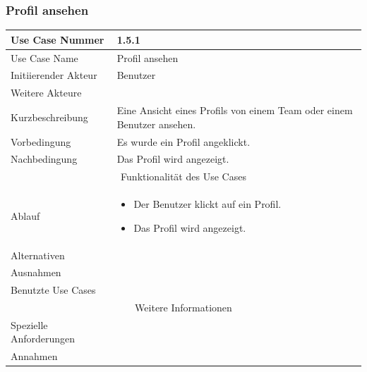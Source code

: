 \documentclass[10pt,a4paper]{article}
\begin{document}
\subsubsection{Profil ansehen}
	\begin{tabularx}{\textwidth}{|l|X|}
	\hline Use Case Nummer & 1.5.1 \\ 
	\hline Use Case Name & Profil ansehen \\ 
	\hline Initiierender Akteur & Benutzer \\
	\hline Weitere Akteure &  \\
	\hline Kurzbeschreibung & Eine Ansicht eines Profils von einem Team oder einem Benutzer ansehen. \\
	\hline Vorbedingung & Es wurde ein Profil angeklickt. \\
	\hline Nachbedingung & Das Profil wird angezeigt. \\
	\hline \multicolumn{2}{|c|}{Funktionalität des Use Cases}\\
	\hline Ablauf & \begin{itemize}
		\item Der Benutzer klickt auf ein Profil.
		\item Das Profil wird angezeigt.
	\end{itemize} \\
	\hline Alternativen &  \\
	\hline Ausnahmen &  \\
	\hline Benutzte Use Cases &  \\
	\hline \multicolumn{2}{|c|}{Weitere Informationen} \\
	\hline Spezielle Anforderungen &  \\
	\hline Annahmen &  \\
	\hline
	\end{tabularx}
\end{document}
